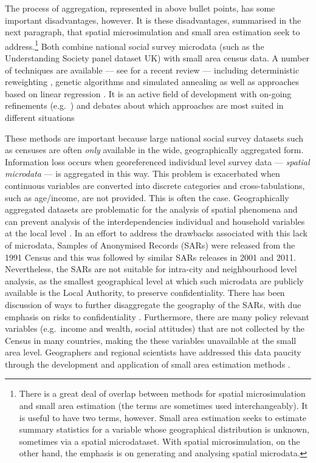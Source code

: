 \documentclass[a4paper,10pt]{article}
\begin{document}
The process of aggregation, represented in above bullet points,
has some important disadvantages, however. It is these disadvantages,
summarised in the next paragraph, that spatial microsimulation and small
area estimation seek to address.\footnote{There
is a great deal of overlap between methods for spatial microsimulation and
small area estimation (the terms are sometimes used 
interchangeably). It is useful
to have two terms, however. Small
area estimation seeks to estimate summary statistics for a variable whose
geographical distribution is unknown, sometimes via a spatial microdataset. With spatial
microsimulation, on the other hand, the emphasis is on generating and analysing
spatial microdata.}
Both combine national social survey microdata
(such as the Understanding Society panel dataset UK) with small area census data.
A number of techniques are available --- see \citet{tanton2014review} for a recent review ---
including deterministic reweighting \citep{Birkin1989a},
genetic algorithms and simulated annealing \citep{Williamson1998}
as well as approaches based on linear regression \citep{Harding2011}.
It is an active field of development with on-going refinements
(e.g.~\citealp{Lovelace2013-trs,Pritchard2012}) and debates
about which approaches are most suited in different situations
\citep{harland2012,Hermes2012a,Smith2009,whitworth2013evaluations,Williamson2013}

These methods are important because large national social survey datasets 
such as censuses are often \emph{only} available in the wide, geographically aggregated
form. Information loss occurs when georeferenced individual level survey data
--- \emph{spatial microdata} --- is aggregated in this way. This
problem is exacerbated when continuous variables
are converted into discrete categories and 
cross-tabulations, such as age/income, are not provided. This is often the case.
Geographically aggregated datasets are
problematic for the analysis of spatial phenomena \citep{Openshaw1984}
and can prevent analysis of the interdependencies individual and household variables
at the local level \citep{Lee2009}.
In an effort to address the drawbacks associated with this lack of microdata,
Samples of Anonymised Records (SARs) were released from the 1991 Census
\citep{marsh1993,middleton1995samples} and this was followed by similar SARs releases in 2001 and 2011.
Nevertheless, the SARs are not suitable for intra-city and neighbourhood level
analysis, as the smallest geographical level at which such microdata are publicly
available is the Local Authority, to preserve confidentiality.
There has been discussion of ways to further disaggregate the geography
of the SARs, with due emphasis on risks to confidentiality \citep{Tranmer2005case4}.
Furthermore, there are many policy relevant variables (e.g.~income and wealth, social attitudes)
that are not collected by the Census in many countries, making the these variables
unavailable at the small area level.
Geographers and regional scientists have addressed this data paucity through the development
and application of small area estimation methods \citep{Ballas2005c,Hermes2012a}.
\end{document}
